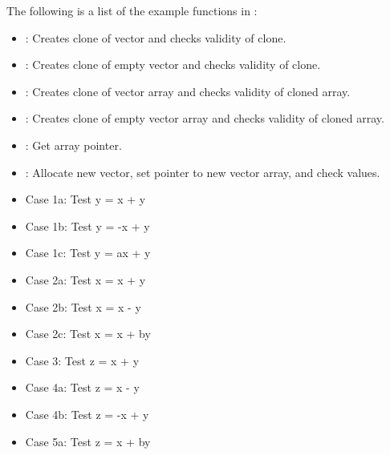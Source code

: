 \documentclass[letterpaper,10pt,english]{sphinxmanual}
\begin{document}
The following is a list of the example functions in :
\begin{itemize}
\item {} 
: Creates clone of vector and checks validity of clone.

\item {} 
: Creates clone of empty vector and checks validity of clone.

\item {} 
: Creates clone of vector array and checks validity of cloned array.

\item {} 
: Creates clone of empty vector array and checks validity of cloned array.

\item {} 
: Get array pointer.

\item {} 
: Allocate new vector, set pointer to new vector array, and check values.

\item {} 
 Case 1a: Test y =  x + y

\item {} 
 Case 1b: Test y = -x + y

\item {} 
 Case 1c: Test y = ax + y

\item {} 
 Case 2a: Test x =  x + y

\item {} 
 Case 2b: Test x =  x - y

\item {} 
 Case 2c: Test x =  x + by

\item {} 
 Case 3:  Test z =  x + y

\item {} 
 Case 4a: Test z =  x - y

\item {} 
 Case 4b: Test z = -x + y

\item {} 
 Case 5a: Test z =  x + by


\end{itemize}
\end{document}
